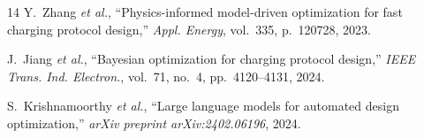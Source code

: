 \documentclass[journal]{IEEEtran}
\begin{document}
\begin{thebibliography}{14}
Y.~Zhang \textit{et al.}, ``Physics-informed model-driven optimization for fast
charging protocol design,'' \textit{Appl. Energy}, vol.~335, p.~120728, 2023.

J.~Jiang \textit{et al.}, ``Bayesian optimization for charging protocol
design,'' \textit{IEEE Trans. Ind. Electron.}, vol.~71, no.~4,
pp.~4120--4131, 2024.

S.~Krishnamoorthy \textit{et al.}, ``Large language models for automated design
optimization,'' \textit{arXiv preprint arXiv:2402.06196}, 2024.

\end{thebibliography}
\end{document}
